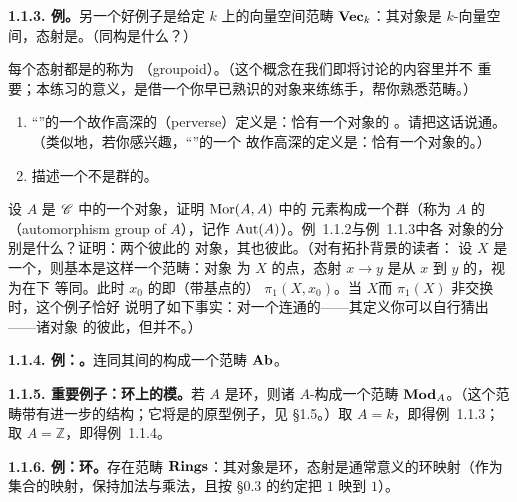 \textbf{1.1.3. 例。}\quad 另一个好例子是给定\trField{} $k$ 上的向量空间范畴 $\mathbf{Vec}_k$：其对象是
$k$-向量空间，态射是\trLinearTransformation{}。（同构是什么？）

\begin{exercise}[无足轻重]\label{ex:perverse-definition-of-groupoid}
每个态射都是\trIsomorphism{}的\trCategory{}称为%
\textbf{\trGroupoid}（groupoid）。（这个概念在我们即将讨论的内容里并不
重要；本练习的意义，是借一个你早已熟识的对象来练练手，帮你熟悉范畴。）
\begin{enumerate}[label=(\alph*)]
\item “\trGroup{}”的一个故作高深的（perverse）定义是：恰有一个对象的%
      \trGroupoid。请把这话说通。（类似地，若你感兴趣，“\trMonoid”的一个
      故作高深的定义是：恰有一个对象的\trCategory。）
\item 描述一个不是群的\trGroupoid。
\end{enumerate}
\end{exercise}

\begin{exercise}\label{ex:automorphism-groups-of-objects}
设 $A$ 是\trCategory{} $\mathscr{C}$ 中的一个对象，证明 $\operatorname{Mor}(A,A)$ 中的%
\trInvertible{}元素构成一个群（称为 $A$ 的\textbf{\trAutomorphismGroup}
（automorphism group of $A$），记作 $\operatorname{Aut}(A)$）。例~1.1.2与例~1.1.3中各
对象的\trAutomorphismGroup{}分别是什么？证明：两个彼此\trIsomorphism{}的
对象，其\trAutomorphismGroup{}也彼此\trIsomorphism。（对有拓扑背景的读者：
设 $X$ 是一个\trTopologicalSpace，则基本\trGroupoid{}是这样一个范畴：对象
为 $X$ 的点，态射 $x\to y$ 是从 $x$ 到 $y$ 的\trPath，视为在\trHomotopy{}下
等同。此时 $x_0$ 的\trAutomorphismGroup{}即（带基点的）\trFundamentalGroup
$\pi_1(X,x_0)$。当 $X$\trConnected{}而 $\pi_1(X)$ 非交换时，这个例子恰好
说明了如下事实：对一个连通的\trGroupoid{}——其定义你可以自行猜出——诸对象
的\trAutomorphismGroup{}彼此\trIsomorphism{}，但并不\trCanonically\trIsomorphism。）
\end{exercise}

\textbf{1.1.4. 例：\trAbelianGroups。}\quad \trAbelianGroups{}连同其间的\trGroupHom{}构成一个范畴 $\mathbf{Ab}$。


\textbf{1.1.5. 重要例子：环上的模。}\quad 若 $A$ 是环，则诸 $A$-\trModule{}构成一个范畴 $\mathbf{Mod}_{A}$。（这个范畴带有进一步的结构；它将是\trAbelianCategory{}的原型例子，见 \S1.5。）取 $A=k$，即得例~1.1.3；取 $A=\mathbb{Z}$，即得例~1.1.4。

\textbf{1.1.6. 例：环。}\quad 存在范畴 $\mathbf{Rings}$：其对象是环，态射是通常意义的环映射（作为集合的映射，保持加法与乘法，且按 \S0.3 的约定把 $1$ 映到 $1$）。

